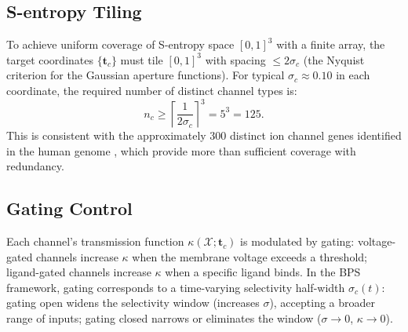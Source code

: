 \documentclass[11pt,twocolumn,a4paper]{article}
\theoremstyle{definition}
\theoremstyle{remark}
\newcommand{\kap}{\kappa}
\begin{document}
\subsection{S-entropy Tiling}

To achieve uniform coverage of S-entropy space $[0,1]^3$ with a finite array,
the target coordinates $\{\mathbf{t}_c\}$ must tile $[0,1]^3$ with spacing
$\leq 2\sigma_c$ (the Nyquist criterion for the Gaussian aperture functions).
For typical $\sigma_c \approx 0.10$ in each coordinate, the required number
of distinct channel types is:
\begin{equation}
n_c \geq \left\lceil \frac{1}{2\sigma_c} \right\rceil^3 = 5^3 = 125.
\label{eq:ntypes}
\end{equation}
This is consistent with the approximately 300 distinct ion channel genes
identified in the human genome \citep{jegla2009}, which provide more than
sufficient coverage with redundancy.

\subsection{Gating Control}

Each channel's transmission function $\kap(\mathcal{X}; \mathbf{t}_c)$ is
modulated by gating: voltage-gated channels increase $\kap$ when the membrane
voltage exceeds a threshold; ligand-gated channels increase $\kap$ when a
specific ligand binds. In the BPS framework, gating corresponds to a
time-varying selectivity half-width $\sigma_c(t)$: gating open widens the
selectivity window (increases $\sigma$), accepting a broader range of inputs;
gating closed narrows or eliminates the window ($\sigma \to 0$, $\kap \to 0$).
\end{document}
